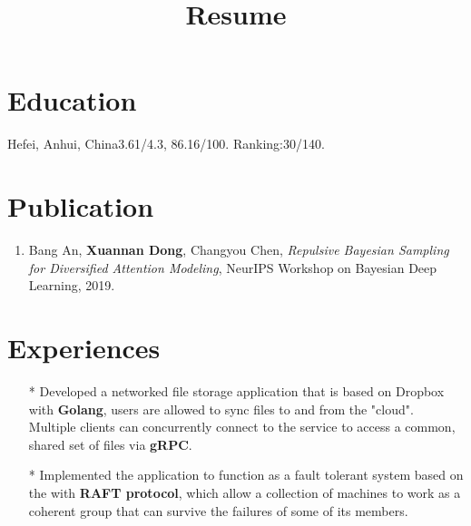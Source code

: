 \documentclass[10pt,letterpaper,sans]{moderncv} %
\title{Resume}
\begin{document}
\makecvtitle %

\vspace{-0.3in}

\section{Education}


{Hefei, Anhui, China}{}{3.61/4.3, 86.16/100. Ranking:30/140. \newline 
{}
}

\section{Publication}

\begin{enumerate}
	\item Bang An, \textbf{Xuannan Dong}, Changyou Chen, \emph{Repulsive Bayesian Sampling for Diversified Attention Modeling}, NeurIPS Workshop on Bayesian Deep Learning, 2019.
\end{enumerate}


\section{Experiences} 

\begin{itemize}
\item[*]{Developed a networked file storage application that is based on Dropbox with \textbf{Golang}, users are allowed to sync files to and from the "cloud". Multiple clients can concurrently connect to the  service to access a common, shared set of files via \textbf{gRPC}.}
\item[*]{Implemented the application to function as a fault tolerant system based on the with \textbf{RAFT protocol}, which allow a collection of machines to work as a coherent group that can survive the failures of some of its members.}
\end{itemize}
\end{document}

